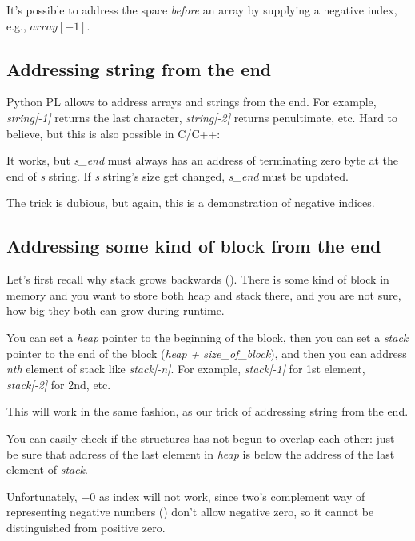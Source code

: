 \label{negative_array_indices}

It's possible to address the space \emph{before} an array by supplying a negative index, e.g., $array[-1]$.

\subsection{Addressing string from the end}

Python \ac{PL} allows to address arrays and strings from the end.
For example, \emph{string[-1]} returns the last character, \emph{string[-2]} returns penultimate, etc.
Hard to believe, but this is also possible in C/C++:



It works, but \textit{s\_end} must always has an address of terminating zero byte at the end of \textit{s} string.
If \textit{s} string's size get changed, \textit{s\_end} must be updated.

The trick is dubious, but again, this is a demonstration of negative indices.

\subsection{Addressing some kind of block from the end}

Let's first recall why stack grows backwards ().
There is some kind of block in memory and you want to store both heap and stack there, and you are not sure,
how big they both can grow during runtime.

You can set a \emph{heap} pointer to the beginning of the block,
then you can set a \emph{stack} pointer to the end of the block (\emph{heap + size\_of\_block}),
and then you can address \emph{nth} element of stack like \emph{stack[-n]}.
For example, \emph{stack[-1]} for 1st element, \emph{stack[-2]} for 2nd, etc.

This will work in the same fashion, as our trick of addressing string from the end.

You can easily check if the structures has not begun to overlap each other:
just be sure that address of the last element in \emph{heap} is below the address of the last element of \emph{stack}.

Unfortunately, $-0$ as index will not work,
since two's complement way of representing negative numbers () don't allow negative zero,
so it cannot be distinguished from positive zero.

